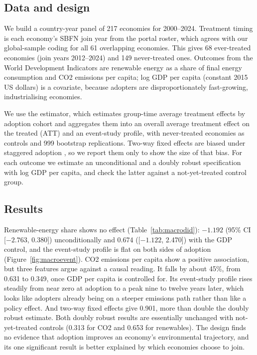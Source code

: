 \documentclass[review,authoryear,12pt]{elsarticle}
\begin{document}
\subsection{Data and design}
\label{sec:macrodidmethod}

We build a country-year panel of 217 economies for 2000--2024. Treatment timing is each economy's SBFN join year from the portal roster, which agrees with our global-sample coding for all 61 overlapping economies. This gives 68 ever-treated economies (join years 2012--2024) and 149 never-treated ones. Outcomes from the World Development Indicators are renewable energy as a share of final energy consumption and CO2 emissions per capita; log GDP per capita (constant 2015 US dollars) is a covariate, because adopters are disproportionately fast-growing, industrialising economies.

We use the \citet{callaway2021} estimator, which estimates group-time average treatment effects by adoption cohort and aggregates them into an overall average treatment effect on the treated (ATT) and an event-study profile, with never-treated economies as controls and 999 bootstrap replications. Two-way fixed effects are biased under staggered adoption \citep{goodmanbacon2021}, so we report them only to show the size of that bias. For each outcome we estimate an unconditional and a doubly robust specification with log GDP per capita, and check the latter against a not-yet-treated control group.

\subsection{Results}
\label{sec:macrodidresults}

Renewable-energy share shows no effect (Table~\ref{tab:macrodid}): $-1.192$ (95\% CI [$-2.763$, 0.380]) unconditionally and 0.674 ([$-1.122$, 2.470]) with the GDP control, and the event-study profile is flat on both sides of adoption (Figure~\ref{fig:macroevent}). CO2 emissions per capita show a positive association, but three features argue against a causal reading. It falls by about 45\%, from 0.631 to 0.349, once GDP per capita is controlled for. Its event-study profile rises steadily from near zero at adoption to a peak nine to twelve years later, which looks like adopters already being on a steeper emissions path rather than like a policy effect. And two-way fixed effects give 0.901, more than double the doubly robust estimate. Both doubly robust results are essentially unchanged with not-yet-treated controls (0.313 for CO2 and 0.653 for renewables). The design finds no evidence that adoption improves an economy's environmental trajectory, and its one significant result is better explained by which economies choose to join.
\end{document}
